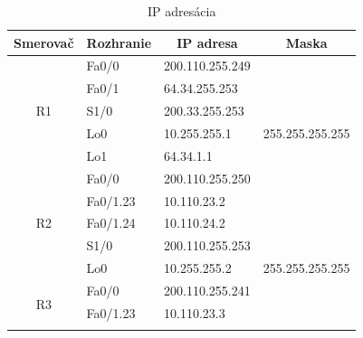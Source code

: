 \documentclass[12pt,twoside,a4paper]{report}
\begin{document}
\begin{table}[!htbp]
\centering
\caption{IP adresácia}
\label{tab:ip_adresacia}
\begin{tabular}{|c|l|l|l|}
\hline
\textbf{Smerovač}    & \multicolumn{1}{c|}{\textbf{Rozhranie}} & \multicolumn{1}{c|}{\textbf{IP adresa}} & \multicolumn{1}{c|}{\textbf{Maska}} \\ \hline
\multirow{5}{*}{R1}  & Fa0/0                                   & 200.110.255.249                         &                                     \\ \cline{2-4} 
                     & Fa0/1                                   & 64.34.255.253                           &                                     \\ \cline{2-4} 
                     & S1/0                                    & 200.33.255.253                          &                                     \\ \cline{2-4} 
                     & Lo0                                     & 10.255.255.1                            & 255.255.255.255                     \\ \cline{2-4} 
                     & Lo1                                     & 64.34.1.1                               &                                     \\ \hline
\multirow{5}{*}{R2}  & Fa0/0                                   & 200.110.255.250                         &                                     \\ \cline{2-4} 
                     & Fa0/1.23                                & 10.110.23.2                             &                                     \\ \cline{2-4} 
                     & Fa0/1.24                                & 10.110.24.2                             &                                     \\ \cline{2-4} 
                     & S1/0                                    & 200.110.255.253                         &                                     \\ \cline{2-4} 
                     & Lo0                                     & 10.255.255.2                            & 255.255.255.255                     \\ \hline
\multirow{4}{*}{R3}  & Fa0/0                                   & 200.110.255.241                         &                                     \\ \cline{2-4} 
                     & Fa0/1.23                                & 10.110.23.3                             &                                     \\ \cline{2-4} 

\end{tabular}
\end{table}
\end{document}
